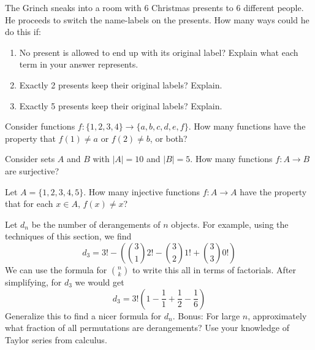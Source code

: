 \documentclass[10pt,]{book}
\theoremstyle{plain}
\theoremstyle{definition}
\theoremstyle{definition}
\theoremstyle{definition}
\theoremstyle{definition}
\numberwithin{equation}{chapter}
\begin{document}
\begin{divisionexercise}{10}\hypertarget{exercise-79}{}
\hypertarget{p-1048}{}%
The Grinch sneaks into a room with 6 Christmas presents to 6 different people. He proceeds to switch the name-labels on the presents. How many ways could he do this if: \leavevmode%
\begin{enumerate}[label=(\alph*)]
\item\hypertarget{li-157}{}\hypertarget{p-1049}{}%
No present is allowed to end up with its original label? Explain what each term in your answer represents. %
\item\hypertarget{li-158}{}\hypertarget{p-1050}{}%
Exactly 2 presents keep their original labels? Explain. %
\item\hypertarget{li-159}{}\hypertarget{p-1051}{}%
Exactly 5 presents keep their original labels? Explain. %
\end{enumerate}
%
\end{divisionexercise}%
\begin{divisionexercise}{11}\hypertarget{exercise-80}{}
\hypertarget{p-1052}{}%
Consider functions \(f: \{1,2,3,4\} \to \{a,b,c,d,e,f\}\). How many functions have the property that \(f(1) \ne a\) or \(f(2) \ne b\), or both?%
\end{divisionexercise}%
\begin{divisionexercise}{12}\hypertarget{exercise-81}{}
\hypertarget{p-1054}{}%
Consider sets \(A\) and \(B\) with \(|A| = 10\) and \(|B| = 5\). How many functions \(f: A \to B\) are surjective?%
\end{divisionexercise}%
\begin{divisionexercise}{13}\hypertarget{exercise-82}{}
\hypertarget{p-1056}{}%
Let \(A = \{1,2,3,4,5\}\). How many injective functions \(f:A \to A\) have the property that for each \(x \in A\), \(f(x) \ne x\)?%
\end{divisionexercise}%
\begin{divisionexercise}{14}\hypertarget{exercise-83}{}
\hypertarget{p-1057}{}%
Let \(d_n\) be the number of derangements of \(n\) objects. For example, using the techniques of this section, we find%
\begin{equation*}
d_3 = 3!-\left({3 \choose 1}2! - {3 \choose 2}1! + {3 \choose 3}0! \right)
\end{equation*}
We can use the formula for \({n \choose k}\) to write this all in terms of factorials.  After simplifying, for \(d_3\) we would get%
\begin{equation*}
d_3 = 3!\left(1 - \frac{1}{1} + \frac{1}{2} - \frac{1}{6} \right)
\end{equation*}
Generalize this to find a nicer formula for \(d_n\).  Bonus: For large \(n\), approximately what fraction of all permutations are derangements?  Use your knowledge of Taylor series from calculus.%
\end{divisionexercise}%
\typeout{************************************************}
\typeout{************************************************}
\end{document}
